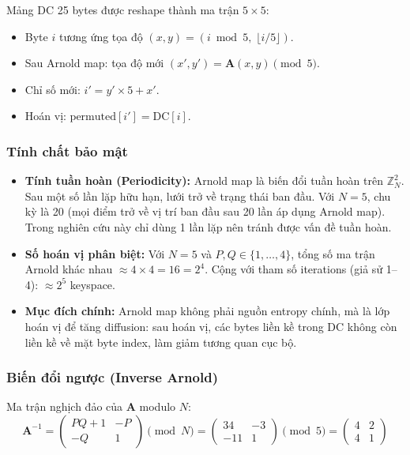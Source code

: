 Mảng DC 25 bytes được reshape thành ma trận $5 \times 5$:
\begin{itemize}
  \item Byte $i$ tương ứng tọa độ $(x, y) = (i \bmod 5,\; \lfloor i/5 \rfloor)$.
  \item Sau Arnold map: tọa độ mới $(x', y') = \mathbf{A}(x, y) \pmod{5}$.
  \item Chỉ số mới: $i' = y' \times 5 + x'$.
  \item Hoán vị: $\text{permuted}[i'] = \text{DC}[i]$.
\end{itemize}

\subsubsection{Tính chất bảo mật}

\begin{itemize}
  \item \textbf{Tính tuần hoàn (Periodicity):} Arnold map là biến đổi tuần hoàn
        trên $\mathbb{Z}_N^2$. Sau một số lần lặp hữu hạn, lưới trở về trạng thái ban đầu.
        Với $N = 5$, chu kỳ là 20 (mọi điểm trở về vị trí ban đầu sau 20 lần áp dụng Arnold map).
        Trong nghiên cứu này chỉ dùng 1 lần lặp nên tránh được vấn đề tuần hoàn.

  \item \textbf{Số hoán vị phân biệt:} Với $N = 5$ và $P, Q \in \{1,\ldots,4\}$,
        tổng số ma trận Arnold khác nhau $\approx 4 \times 4 = 16 = 2^4$.
        Cộng với tham số iterations (giả sử 1--4): $\approx 2^5$ keyspace.

  \item \textbf{Mục đích chính:} Arnold map không phải nguồn entropy chính,
        mà là lớp hoán vị để tăng diffusion: sau hoán vị, các bytes liền kề
        trong DC không còn liền kề về mặt byte index, làm giảm tương quan cục bộ.
\end{itemize}

\subsubsection{Biến đổi ngược (Inverse Arnold)}

Ma trận nghịch đảo của $\mathbf{A}$ modulo $N$:
\begin{equation}
\mathbf{A}^{-1} = \begin{pmatrix} PQ+1 & -P \\ -Q & 1 \end{pmatrix} \pmod{N}
= \begin{pmatrix} 34 & -3 \\ -11 & 1 \end{pmatrix} \pmod{5}
= \begin{pmatrix} 4 & 2 \\ 4 & 1 \end{pmatrix}
\end{equation}

